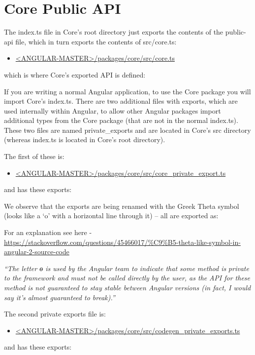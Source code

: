 \section{Core Public API}

The index.ts file in Core’s root directory just exports the contents of the public-api file,
which in turn exports the contents of src/core.ts:

\begin{itemize}
  \item \href{https://github.com/angular/angular/blob/master/packages/core/src/core.ts}
        {<ANGULAR-MASTER>/packages/core/src/core.ts}
\end{itemize}

which is where Core’s exported API is defined:



If you are writing a normal Angular application, to use the Core package you will
import Core’s index.ts. There are two additional files with exports, which are used
internally within Angular, to allow other Angular packages import additional types
from the Core package (that are not in the normal index.ts). These two files are
named private\_exports and are located in Core’s src directory (whereas index.ts is
located in Core’s root directory).

The first of these is:

\begin{itemize}
  \item \href{https://github.com/angular/angular/blob/master/packages/core/src/core_private_export.ts}
        {<ANGULAR-MASTER>/packages/core/src/core\_private\_export.ts}
\end{itemize}

and has these exports:



We observe that the exports are being renamed with the Greek Theta symbol (looks
like a ‘o’ with a horizontal line through it) – all are exported as:



For an explanation see here -
\url{https://stackoverflow.com/questions/45466017/%C9%B5-theta-like-symbol-in-angular-2-source-code}

\emph{“The letter ɵ is used by the Angular team to indicate that some method is}
\emph{private to the framework and must not be called directly by the user, as the}
\emph{API for these method is not guaranteed to stay stable between Angular}
\emph{versions (in fact, I would say it’s almost guaranteed to break).”}

The second private exports file is:

\begin{itemize}
  \item \href{https://github.com/angular/angular/blob/master/packages/core/src/codegen_private_exports.ts}
        {<ANGULAR-MASTER>/packages/core/src/codegen\_private\_exports.ts}
\end{itemize}

and has these exports:


